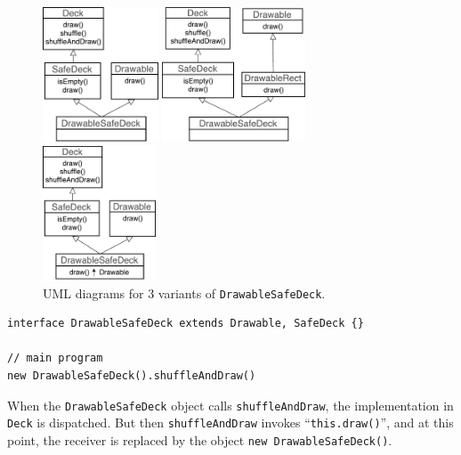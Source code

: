 \begin{figure}[t]
  \centering
  \begin{minipage}[t]{0.32\textwidth}
  \includegraphics[height=4cm]{pics/DrawableSafeDeck1.pdf}
  \end{minipage}
  \centering
  \hspace*{2pt}
  \begin{minipage}[t]{0.38\textwidth}
  \includegraphics[height=4cm]{pics/DrawableSafeDeck0.pdf}
  \end{minipage}
  \centering
  \hspace*{2pt}
  \begin{minipage}[t]{0.25\textwidth}
  \includegraphics[height=4cm]{pics/DrawableSafeDeck3.pdf}
  \end{minipage}  
  \caption{UML diagrams for 3 variants of \lstinline|DrawableSafeDeck|.}\label{fig:drawablesafedeck}
\end{figure}

\vspace{3pt}\begin{lstlisting}
interface DrawableSafeDeck extends Drawable, SafeDeck {}

// main program
new DrawableSafeDeck().shuffleAndDraw()
\end{lstlisting}\vspace{3pt}
When the \lstinline|DrawableSafeDeck| object calls \lstinline|shuffleAndDraw|, the implementation in \lstinline|Deck|
is dispatched. But then \lstinline|shuffleAndDraw| invokes ``\lstinline|this.draw()|'', and at this point, the receiver
is replaced by the object \lstinline|new DrawableSafeDeck()|.

